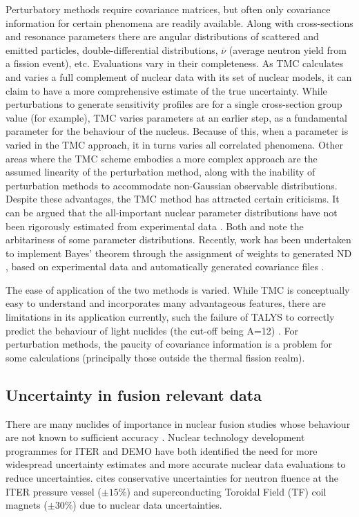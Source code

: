 Perturbatory methods require covariance matrices, but often only covariance information for certain phenomena are readily available. Along with cross-sections and resonance parameters there are angular distributions of scattered and emitted particles, double-differential distributions, $\overline{\nu}$ (average neutron yield from a fission event), etc. Evaluations vary in their completeness. As TMC calculates and varies a full complement of nuclear data with its set of nuclear models, it can claim to have a more comprehensive estimate of the true uncertainty. While perturbations to generate sensitivity profiles are for a single cross-section group value (for example), TMC varies parameters at an earlier step, as a fundamental parameter for the behaviour of the nucleus. Because of this, when a parameter is varied in the TMC approach, it in turns varies all correlated phenomena. Other areas where the TMC scheme embodies a more complex approach are the assumed linearity of the perturbation method, along with the inability of perturbation methods to accommodate non-Gaussian observable distributions. Despite these advantages, the TMC method has attracted certain criticisms. It can be argued that the all-important nuclear parameter distributions have not been rigorously estimated from experimental data \cite{Helgesson2017}. Both \citeauthor{Capote2010} and \citeauthor{Rising2012} note the arbitariness of some parameter distributions. Recently, work has been undertaken to implement Bayes' theorem through the assignment of weights to generated ND \cite{Koning2015a}, based on experimental data and automatically generated covariance files \cite{Helgesson2017}.


The ease of application of the two methods is varied. While TMC is conceptually easy to understand and incorporates many advantageous features, there are limitations in its application currently, such the failure of TALYS to correctly predict the behaviour of light nuclides (the cut-off being A=12) \cite{Rochman2011}. For perturbation methods, the paucity of covariance information is a problem for some calculations (principally those outside the thermal fission realm). 

\FloatBarrier
\subsection{Uncertainty in fusion relevant data}
There are many nuclides of importance in nuclear fusion studies whose behaviour are not known to sufficient accuracy \cite{Forrest2011}. Nuclear technology development programmes for ITER \cite{Batistoni2008} and DEMO \cite{Abdou2015} have both identified the need for more widespread uncertainty estimates and more accurate nuclear data evaluations to reduce uncertainties. \citeauthor{Batistoni2008} cites conservative uncertainties for neutron fluence at the ITER pressure vessel ($\pm 15\%$) and superconducting Toroidal Field (TF) coil magnets ($\pm 30\%$) due to nuclear data uncertainties. 

